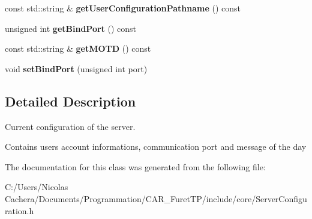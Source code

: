 \begin{DoxyCompactItemize}
\item 
\hypertarget{classFTP_1_1ServerConfiguration_ac1247c63b4e2501931137f3d2093a94f}{}const std\+::string \& {\bfseries get\+User\+Configuration\+Pathname} () const \label{classFTP_1_1ServerConfiguration_ac1247c63b4e2501931137f3d2093a94f}

\item 
\hypertarget{classFTP_1_1ServerConfiguration_a511395794c7c6ec3d14241ae46089891}{}unsigned int {\bfseries get\+Bind\+Port} () const \label{classFTP_1_1ServerConfiguration_a511395794c7c6ec3d14241ae46089891}

\item 
\hypertarget{classFTP_1_1ServerConfiguration_a6a943d6b2299fcc9e335ae8afad8a565}{}const std\+::string \& {\bfseries get\+M\+O\+T\+D} () const \label{classFTP_1_1ServerConfiguration_a6a943d6b2299fcc9e335ae8afad8a565}

\item 
\hypertarget{classFTP_1_1ServerConfiguration_a4fc696bd9844369a9c494b4df1d6e87e}{}void {\bfseries set\+Bind\+Port} (unsigned int port)\label{classFTP_1_1ServerConfiguration_a4fc696bd9844369a9c494b4df1d6e87e}

\end{DoxyCompactItemize}


\subsection{Detailed Description}
Current configuration of the server. 

Contains user\textquotesingle{}s account informations, communication port and message of the day 

The documentation for this class was generated from the following file\+:\begin{DoxyCompactItemize}
\item 
C\+:/\+Users/\+Nicolas Cachera/\+Documents/\+Programmation/\+C\+A\+R\+\_\+\+Furet\+T\+P/include/core/Server\+Configuration.\+h\end{DoxyCompactItemize}
